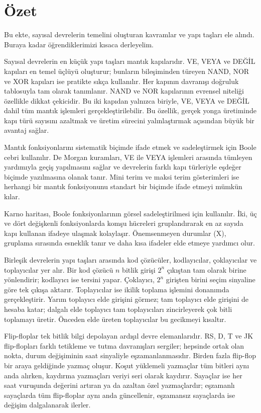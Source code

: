 \section*{Özet}

Bu ekte, sayısal devrelerin temelini oluşturan kavramlar ve yapı taşları ele alındı. Buraya kadar öğrendiklerimizi kısaca derleyelim.

Sayısal devrelerin en küçük yapı taşları mantık kapılarıdır. VE, VEYA ve DEĞİL kapıları en temel üçlüyü oluşturur; bunların bileşiminden türeyen NAND, NOR ve XOR kapıları ise pratikte sıkça kullanılır. Her kapının davranışı doğruluk tablosuyla tam olarak tanımlanır. NAND ve NOR kapılarının evrensel niteliği özellikle dikkat çekicidir. Bu iki kapıdan yalnızca biriyle, VE, VEYA ve DEĞİL dahil tüm mantık işlemleri gerçekleştirilebilir. Bu özellik, gerçek yonga üretiminde kapı türü sayısını azaltmak ve üretim sürecini yalınlaştırmak açısından büyük bir avantaj sağlar.

Mantık fonksiyonlarını sistematik biçimde ifade etmek ve sadeleştirmek için Boole cebri kullanılır. De Morgan kuramları, VE ile VEYA işlemleri arasında tümleyen yardımıyla geçiş yapılmasını sağlar ve devrelerin farklı kapı türleriyle eşdeğer biçimde yazılmasına olanak tanır. Mini terim ve maksi terim gösterimleri ise herhangi bir mantık fonksiyonunu standart bir biçimde ifade etmeyi mümkün kılar.

Karno haritası, Boole fonksiyonlarının görsel sadeleştirilmesi için kullanılır. İki, üç ve dört değişkenli fonksiyonlarda komşu hücreleri gruplandırarak en az sayıda kapı kullanan ifadeye ulaşmak kolaylaşır. Önemsenmeyen durumlar (X), gruplama sırasında esneklik tanır ve daha kısa ifadeler elde etmeye yardımcı olur.

Birleşik devrelerin yapı taşları arasında kod çözücüler, kodlayıcılar, çoklayıcılar ve toplayıcılar yer alır. Bir kod çözücü $n$ bitlik girişi $2^n$ çıkıştan tam olarak birine yönlendirir; kodlayıcı ise tersini yapar. Çoklayıcı, $2^n$ girişten birini seçim sinyaline göre tek çıkışa aktarır. Toplayıcılar ise ikilik toplama işlemini donanımda gerçekleştirir. Yarım toplayıcı elde girişini görmez; tam toplayıcı elde girişini de hesaba katar; dalgalı elde toplayıcı tam toplayıcıları zincirleyerek çok bitli toplamayı üretir. Önceden elde üreten toplayıcılar bu gecikmeyi kısaltır.

Flip-floplar tek bitlik bilgi depolayan ardışıl devre elemanlarıdır. RS, D, T ve JK flip-flopları farklı tetikleme ve tutma davranışları sergiler; hepsinde ortak olan nokta, durum değişiminin saat sinyaliyle eşzamanlanmasıdır. Birden fazla flip-flop bir araya geldiğinde yazmaç oluşur. Koşut yüklemeli yazmaçlar tüm bitleri aynı anda alırken, kaydırma yazmaçları veriyi seri olarak kaydırır. Sayaçlar ise her saat vuruşunda değerini artıran ya da azaltan özel yazmaçlardır; eşzamanlı sayaçlarda tüm flip-floplar aynı anda güncellenir, eşzamansız sayaçlarda ise değişim dalgalanarak ilerler.

